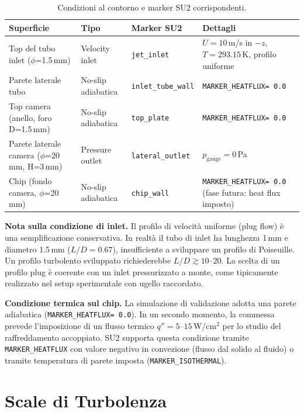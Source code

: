 \documentclass[11pt,a4paper]{article}
\newcommand{\ttcfg}[1]{\texttt{\color{codegray}#1}}
\begin{document}
\begin{table}[H]
  \centering
  \caption{Condizioni al contorno e marker SU2 corrispondenti.}
  \label{tab:bc}
  \begin{tabularx}{\textwidth}{lllX}
    \toprule
    \rowcolor{tablehead}
    \textbf{Superficie} & \textbf{Tipo} & \textbf{Marker SU2} & \textbf{Dettagli} \\
    \midrule
    Top del tubo inlet ($\phi$=1.5\,mm) & Velocity inlet & \ttcfg{jet\_inlet} & $U=10$\,m/s in $-z$, $T=293.15$\,K, profilo uniforme \\
    Parete laterale tubo & No-slip adiabatica & \ttcfg{inlet\_tube\_wall} & \ttcfg{MARKER\_HEATFLUX= 0.0} \\
    Top camera (anello, foro D=1.5\,mm) & No-slip adiabatica & \ttcfg{top\_plate} & \ttcfg{MARKER\_HEATFLUX= 0.0} \\
    Parete laterale camera ($\phi$=20\,mm, H=3\,mm) & Pressure outlet & \ttcfg{lateral\_outlet} & $p_{\mathrm{gauge}} = 0$\,Pa \\
    Chip (fondo camera, $\phi$=20\,mm) & No-slip adiabatica & \ttcfg{chip\_wall} & \ttcfg{MARKER\_HEATFLUX= 0.0} (fase futura: heat flux imposto) \\
    \bottomrule
  \end{tabularx}
\end{table}

\textbf{Nota sulla condizione di inlet.} Il profilo di velocità uniforme (plug flow) è una semplificazione conservativa. In realtà il tubo di inlet ha lunghezza 1\,mm e diametro 1.5\,mm ($L/D = 0.67$), insufficiente a sviluppare un profilo di Poiseuille. Un profilo turbolento sviluppato richiederebbe $L/D \gtrsim 10$--20. La scelta di un profilo plug è coerente con un inlet pressurizzato a monte, come tipicamente realizzato nel setup sperimentale con ugello raccordato.

\textbf{Condizione termica sul chip.} La simulazione di validazione adotta una parete adiabatica (\ttcfg{MARKER\_HEATFLUX= 0.0}). In un secondo momento, la commessa prevede l'imposizione di un flusso termico $q'' = 5\text{--}15$\,W/cm$^2$ per lo studio del raffreddamento accoppiato. SU2 supporta questa condizione tramite \ttcfg{MARKER\_HEATFLUX} con valore negativo in convezione (flusso dal solido al fluido) o tramite temperatura di parete imposta (\ttcfg{MARKER\_ISOTHERMAL}).

\section{Scale di Turbolenza}
\label{sec:scale}
\end{document}
